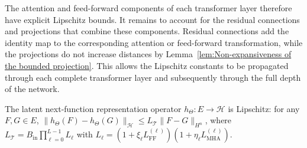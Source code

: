 The attention and feed-forward components of each transformer layer therefore have explicit Lipschitz bounds. It remains to account for the residual connections and projections that combine these components. Residual connections add the identity map to the corresponding attention or feed-forward transformation, while the projections do not increase distances by Lemma~\ref{lem:Non-expansiveness of the bounded projection}. This allows the Lipschitz constants to be propagated through each complete transformer layer and subsequently through the full depth of the network.

\begin{proposition}
\label{prop:Lipschitz continuity of the functional transformer}
The latent next-function representation operator \(h_\Theta:E\to\mathcal H\) is Lipschitz: for any \(F,G \in E\), \(\|h_\Theta(F)-h_\Theta(G)\|_{\mathcal H}\leqslant L_{\mathcal T}\|F-G\|_{H^n}\), where \(L_{\mathcal T}=B_{\mathrm{in}}\prod_{\ell=0}^{L-1}L_\ell\) with \(L_\ell=\left(1+\xi_\ell L_{\mathrm{FF}}^{(\ell)}\right)\left(1+\eta_\ell L_{\mathrm{MHA}}^{(\ell)}\right)\). 
\end{proposition}

